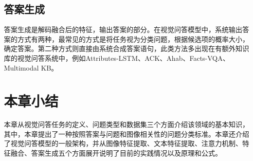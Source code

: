 \subsection{答案生成}
答案生成是解码融合后的特征，输出答案的部分。在视觉问答模型中，系统输出答案的方式有两种，最常见的方式是将任务视为分类问题，根据候选项的概率大小，确定答案。第二种方式则直接由系统合成答案语句，此类方法多出现在有额外知识库的视觉问答系统中，例如Attributes-LSTM、ACK、Ahab、Facts-VQA、Multimodal KB。

\section{本章小结}
本章从视觉问答任务的定义、问题类型和数据集三个方面介绍该领域的基本知识，其中，本章提出了一种按照答案与问题和图像相关性的问题分类标准。本章还介绍了视觉问答模型的一般架构，并从图像特征提取、文本特征提取、注意力机制、特征融合、答案生成五个方面展开说明了目前的实践情况以及原理和公式。
